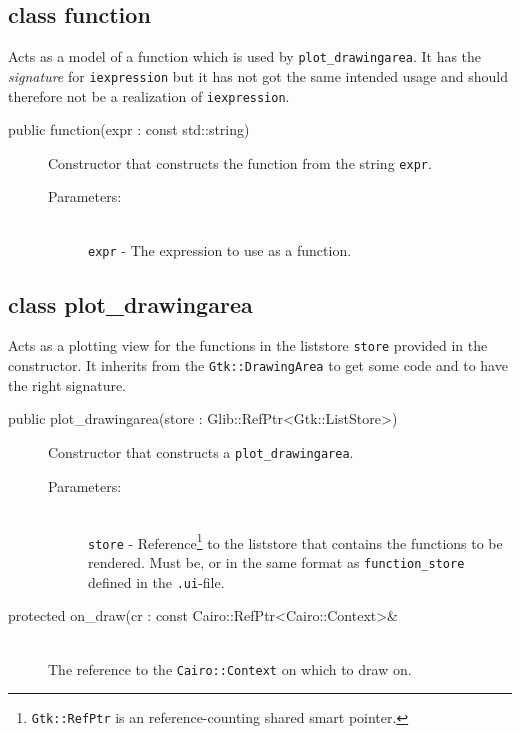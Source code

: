 \documentclass[a4paper,11pt]{kth-mag}
\begin{document}
\subsection{class function}
Acts as a model of a function which is used by \texttt{plot\_drawingarea}.
It has the \emph{signature} for \texttt{iexpression} but it has not got the
same intended usage and should therefore not be a realization of
\texttt{iexpression}.

\begin{description}
    \item[public function(expr : const std::string)] Constructor 
    that constructs the function from the string \texttt{expr}.
    \begin{description}
        \item[Parameters:]~\\
            \verb+expr+ - The expression to use as a function.
    \end{description}
\end{description}

\subsection{class plot\_drawingarea}
Acts as a plotting view for the functions in the liststore \texttt{store}
provided in the constructor. It inherits from the \texttt{Gtk::DrawingArea} to
get some code and to have the right signature.

\begin{description}
    \item[public plot\_drawingarea(store : Glib::RefPtr<Gtk::ListStore>)] Constructor 
    that constructs a \texttt{plot\_drawingarea}. 
    \begin{description}
        \item[Parameters:]~\\
            \verb+store+ - Reference\footnote{\texttt{Gtk::RefPtr} is an
            reference-counting shared smart pointer.} to the liststore that contains the
            functions to be rendered. Must be, or in the same format as
            \texttt{function\_store} defined in the \texttt{.ui}-file.
    \end{description}
\end{description}

\begin{description}
   \item[protected on\_draw(cr : const Cairo::RefPtr<Cairo::Context>&]~\\
    The reference to the \texttt{Cairo::Context} on which to draw on.
\end{description}
\end{document}
